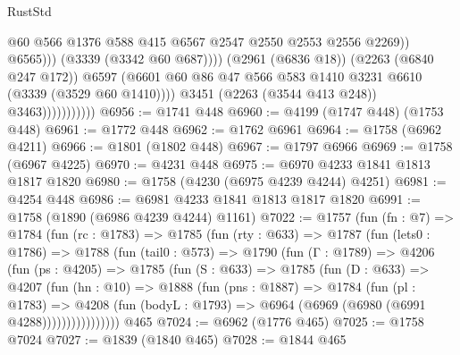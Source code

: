 \begin{lexlean}{RustStd}
\begin{coremodule}
                                          @60
                                          @566
                                          @1376
                                          @588
                                          @415
                                          @6567
                                          @2547
                                          @2550
                                          @2553
                                          @2556
                                          @2269))
                                      @6565)))
                                (@3339 (@3342 @60 @687))))
                            (@2961 (@6836 @18))
                            (@2263 (@6840 @247 @172))
                            @6597
                            (@6601
                              @60
                              @86
                              @47
                              @566
                              @583
                              @1410
                              @3231
                              @6610
                              (@3339 (@3529 @60 @1410))))
                          @3451
                          (@2263 (@3544 @413 @248))
                          @3463)))))))))))
@6956 := @1741 @448
@6960 := @4199 (@1747 @448) (@1753 @448)
@6961 := @1772 @448
@6962 := @1762 @6961
@6964 := @1758 (@6962 @4211)
@6966 := @1801 (@1802 @448)
@6967 := @1797 @6966
@6969 := @1758 (@6967 @4225)
@6970 := @4231 @448
@6975 := @6970 @4233 @1841 @1813 @1817 @1820
@6980 := @1758 (@4230 (@6975 @4239 @4244) @4251)
@6981 := @4254 @448
@6986 := @6981 @4233 @1841 @1813 @1817 @1820
@6991 := @1758 (@1890 (@6986 @4239 @4244) @1161)
@7022 := @1757
    (fun (fn : @7) =>
    @1784
      (fun (rc : @1783) =>
      @1785
        (fun (rty : @633) =>
        @1787
          (fun (lets0 : @1786) =>
          @1788
            (fun (tail0 : @573) =>
            @1790
              (fun (Γ : @1789) =>
              @4206
                (fun (ps : @4205) =>
                @1785
                  (fun (S : @633) =>
                  @1785
                    (fun (D : @633) =>
                    @4207
                      (fun (hn : @10) =>
                      @1888
                        (fun (pns : @1887) =>
                        @1784
                          (fun (pl : @1783) =>
                          @4208
                            (fun (bodyL : @1793) => @6964 (@6969 (@6980 (@6991 @4288))))))))))))))))
    @465
@7024 := @6962 (@1776 @465)
@7025 := @1758 @7024
@7027 := @1839 (@1840 @465)
@7028 := @1844 @465

\end{coremodule}
\end{lexlean}
